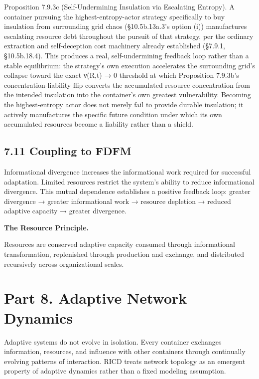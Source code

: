 \documentclass[
]{article}
\begin{document}
Proposition 7.9.3c (Self-Undermining Insulation via Escalating Entropy).
A container pursuing the highest-entropy-actor strategy specifically to
buy insulation from surrounding grid chaos (§10.5b.13a.3's option (i))
manufactures escalating resource debt throughout the pursuit of that
strategy, per the ordinary extraction and self-deception cost machinery
already established (§7.9.1, §10.5b.18.4). This produces a real,
self-undermining feedback loop rather than a stable equilibrium: the
strategy's own execution accelerates the surrounding grid's collapse
toward the exact ν(R,t) → 0 threshold at which Proposition 7.9.3b's
concentration-liability flip converts the accumulated resource
concentration from the intended insulation into the container's own
greatest vulnerability. Becoming the highest-entropy actor does not
merely fail to provide durable insulation; it actively manufactures the
specific future condition under which its own accumulated resources
become a liability rather than a shield.

\hypertarget{coupling-to-fdfm}{%
\subsection{7.11 Coupling to FDFM}\label{coupling-to-fdfm}}

Informational divergence increases the informational work required for
successful adaptation. Limited resources restrict the system's ability
to reduce informational divergence. This mutual dependence establishes a
positive feedback loop: greater divergence → greater informational work
→ resource depletion → reduced adaptive capacity → greater divergence.

\textbf{The Resource Principle.}

Resources are conserved adaptive capacity consumed through informational
transformation, replenished through production and exchange, and
distributed recursively across organizational scales.

\hypertarget{part-8.-adaptive-network-dynamics}{%
\section{Part 8. Adaptive Network
Dynamics}\label{part-8.-adaptive-network-dynamics}}

Adaptive systems do not evolve in isolation. Every container exchanges
information, resources, and influence with other containers through
continually evolving patterns of interaction. RICD treats network
topology as an emergent property of adaptive dynamics rather than a
fixed modeling assumption.
\end{document}
